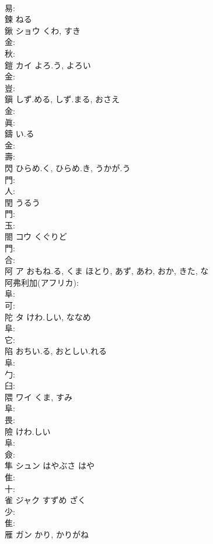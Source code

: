 \documentclass[8pt]{extreport}
\begin{document}
\begin{CJK}{UTF8}{min}
\\	易: 
\\	鍊		ねる				
\\	鍬	ショウ	くわ, すき		
\\	金: 
\\	秋: 
\\	鎧	カイ	よろ.う, よろい		
\\	金: 
\\	豈: 
\\	鎭		しず.める, しず.まる, おさえ				
\\	金: 
\\	眞: 
\\	鑄		い.る				
\\	金: 
\\	壽: 
\\	閃		ひらめ.く, ひらめ.き, うかが.う			
\\	門: 
\\	人: 
\\	閏		うるう				
\\	門: 
\\	玉: 
\\	閤	コウ	くぐりど		
\\	門: 
\\	合: 
\\	阿	ア	おもね.る, くま	ほとり, あず, あわ, おか, きた, な	
\\	阿弗利加(アフリカ): 
\\	阜: 
\\	可: 
\\	陀	タ	けわ.しい, ななめ		
\\	阜: 
\\	它: 
\\	陷		おちい.る, おとしい.れる				
\\	阜: 
\\	勹: 
\\	臼: 
\\	隈	ワイ	くま, すみ		
\\	阜: 
\\	畏: 
\\	險		けわ.しい				
\\	阜: 
\\	僉: 
\\	隼	シュン	はやぶさ	はや	
\\	隹: 
\\	十: 
\\	雀	ジャク	すずめ	ざく	
\\	少: 
\\	隹: 
\\	雁	ガン	かり, かりがね		

\end{CJK}
\end{document}
